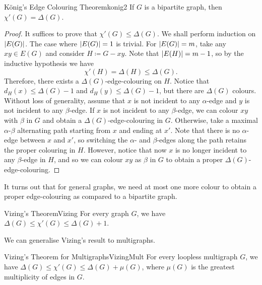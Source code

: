 \documentclass[math]{amznotes}
\theoremstyle{remark}
\newcommand{\0}{\mathbf{0}}
\newcommand{\1}{\mathbf{1}}
\begin{document}
\begin{thmbox}{K\"{o}nig's Edge Colouring Theorem}{konig2}
    If $G$ is a bipartite graph, then $\chi'(G) = \Delta(G)$.
    \tcblower
    \begin{proof}
        It suffices to prove that $\chi'(G) \leq \Delta(G)$. We shall perform induction on ${\left\lvert {E(G)} \right\rvert}$. The case where ${\left\lvert {E(G)} \right\rvert} = 1$ is trivial. For ${\left\lvert {E(G)} \right\rvert} = m$, take any $xy \in E(G)$ and consider $H \coloneqq G - xy$. Note that ${\left\lvert {E(H)} \right\rvert} = m - 1$, so by the inductive hypothesis we have 
        \begin{equation*}
            \chi'(H) = \Delta(H) \leq \Delta(G).
        \end{equation*}
        Therefore, there exists a $\Delta(G)$-edge-colouring on $H$. Notice that $d_H(x) \leq \Delta(G) - 1$ and $d_H(y) \leq \Delta(G) - 1$, but there are $\Delta(G)$ colours. Without loss of generality, assume that $x$ is not incident to any $\alpha$-edge and $y$ is not incident to any $\beta$-edge. If $x$ is not incident to any $\beta$-edge, we can colour $xy$ with $\beta$ in $G$ and obtain a $\Delta(G)$-edge-colouring in $G$. Otherwise, take a maximal $\alpha$-$\beta$ alternating path starting from $x$ and ending at $x'$. Note that there is no $\alpha$-edge between $x$ and $x'$, so switching the $\alpha$- and $\beta$-edges along the path retains the proper colouring in $H$. However, notice that now $x$ is no longer incident to any $\beta$-edge in $H$, and so we can colour $xy$ as $\beta$ in $G$ to obtain a proper $\Delta(G)$-edge-colouring.
    \end{proof}
\end{thmbox}
It turns out that for general graphs, we need at most one more colour to obtain a proper edge-colouring as compared to a bipartite graph.
\begin{thmbox}{Vizing's Theorem}{Vizing}
    For every graph $G$, we have $\Delta(G) \leq \chi'(G) \leq \Delta(G) + 1$.
\end{thmbox}
We can generalise Vizing's result to multigraphs.
\begin{corbox}{Vizing's Theorem for Multigraphs}{VizingMult}
    For every loopless multigraph $G$, we have $\Delta(G) \leq \chi'(G) \leq \Delta(G) + \mu(G)$, where $\mu(G)$ is the greatest multiplicity of edges in $G$.
\end{corbox}
\end{document}
